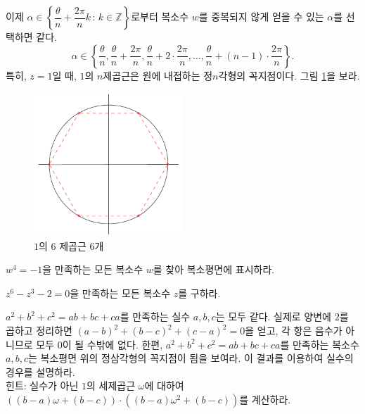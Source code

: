 이제 $\alpha \in \left\{ \dfrac{\theta}{n}+ \dfrac{2\pi}{n}k \,:\, k\in\mathbb Z \right\}$로부터
복소수 $w$를 중복되지 않게 얻을 수 있는 $\alpha$를 선택하면 같다.
$$
\alpha \in \left\{
\dfrac\theta n,  \dfrac\theta n+ \dfrac{2\pi}n, \dfrac\theta n + 2\cdot \dfrac{2\pi}n, \ldots,
\dfrac\theta n+ (n-1)\cdot \dfrac{2\pi}n
\right\}.
$$
특히, $z=1$일 때, $1$의 $n$제곱근은 원에 내접하는 정$n$각형의 꼭지점이다.
그림 \ref{fig-1-8}을 보라.
\begin{figure}[!h]
\begin{center}
\includegraphics[width=0.5\textwidth]{./SaltChapter/figs/fig-1-8}
\end{center}
\caption{$1$의 $6$ 제곱근 $6$개}
\label{fig-1-8}
\end{figure}

\begin{salt_exercise} \label{ex-1-9}
$w^4=-1$을 만족하는 모든 복소수 $w$를 찾아
복소평면에 표시하라.
\end{salt_exercise}

\begin{salt_exercise} \label{ex-1-10}
$z^6-z^3-2=0$을 만족하는 모든 복소수 $z$를 구하라.
\end{salt_exercise}

\begin{salt_exercise} \label{ex-1-11}
$a^2+b^2+c^2= ab+bc+ca$를 만족하는 실수 $a,b,c$는 모두 같다.
실제로 양변에 $2$를 곱하고 정리하면
$(a-b)^2+(b-c)^2+(c-a)^2=0$을 얻고, 
각 항은 음수가 아니므로 모두 $0$이 될 수밖에 없다.
한편, $a^2+b^2+c^2= ab+bc+ca$를 만족하는 복소수 $a,b,c$는
복소평면 위의 정삼각형의 꼭지점이 됨을 보여라.
이 결과를 이용하여 실수의 경우를 설명하라. \\[1ex]
힌트: 실수가 아닌 $1$의 세제곱근 $\omega$에 대하여
$((b-a)\omega + (b-c))\cdot((b-a)\omega^2 + (b-c))$를 계산하라.
\end{salt_exercise}

